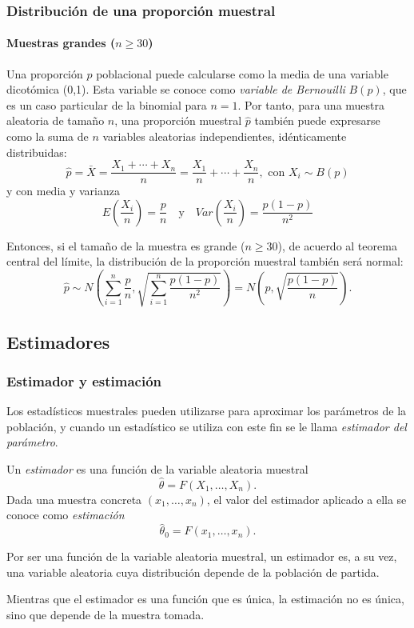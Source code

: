 \begin{frame}
\frametitle{Distribución de una proporción muestral}
\framesubtitle{Muestras grandes ($n\geq 30$)}
Una proporción $p$ poblacional puede calcularse como la media de una variable dicotómica (0,1).
Esta variable se conoce como \emph{variable de Bernouilli} $B(p)$, que es un caso particular de la binomial para $n=1$.
Por tanto, para una muestra aleatoria de tamaño $n$, una proporción muestral $\hat p$ también puede expresarse como la suma de $n$ variables aleatorias independientes, idénticamente distribuidas:
\[
\hat p = \bar X = \frac{X_1+\cdots+X_n}{n} = \frac{X_1}{n}+\cdots+\frac{X_n}{n}, \mbox{ con } X_i\sim B(p)
\]
y con media y varianza
\[
E\left(\frac{X_i}{n}\right) =\frac{p}{n} \quad  \mbox{y} \quad Var\left(\frac{X_i}{n}\right) = \frac{p(1-p)}{n^2}
\]

Entonces, si el tamaño de la muestra es grande ($n\geq 30$), de acuerdo al teorema central del límite, la distribución de la proporción muestral también será normal:
\[
\hat p \sim N\left(\sum_{i=1}^n \frac{p}{n},\sqrt{\sum_{i=1}^n \frac{p(1-p)}{n^2}} \right) = N\left(p,\sqrt{\frac{p(1-p)}{n}} \right).
\]
\end{frame}


\subsection{Estimadores}
\begin{frame}
\frametitle{Estimador y estimación}
Los estadísticos muestrales pueden utilizarse para aproximar los parámetros de la población, y cuando un estadístico se utiliza con este fin se le llama \emph{estimador del parámetro}.
\begin{definicion}
Un \emph{estimador} es una función de la variable aleatoria muestral
\[
\hat \theta = F(X_1,\ldots,X_n).
\]
Dada una muestra concreta $(x_1,\ldots,x_n)$, el valor del estimador aplicado a ella se conoce como \emph{estimación}
\[
\hat \theta_0 = F(x_1,\ldots,x_n).
\]
\end{definicion}

Por ser una función de la variable aleatoria muestral, un estimador es, a su vez, una variable aleatoria cuya distribución depende de la población de partida.

Mientras que el estimador es una función que es única, la estimación no es única, sino que depende de la muestra tomada.
\end{frame}


